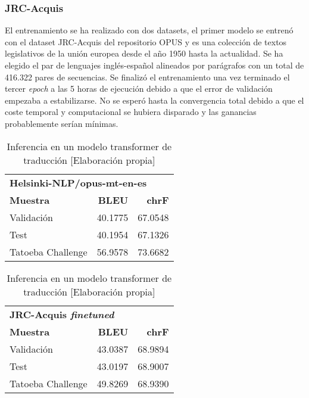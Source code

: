 \subsubsection{JRC-Acquis}
El entrenamiento se ha realizado con dos datasets, el primer modelo se entrenó con el dataset JRC-Acquis del repositorio OPUS \cite{CORPUS} y es una colección de textos legislativos de la unión europea desde el año 1950 hasta la actualidad. Se ha elegido el par de lenguajes inglés-español alineados por parágrafos con un total de 416.322 pares de secuencias.
Se finalizó el entrenamiento una vez terminado el tercer \textit{epoch} a las 5 horas de ejecución debido a que el error de validación empezaba a estabilizarse. No se esperó hasta la convergencia total debido a que el coste temporal y computacional se hubiera disparado y las ganancias probablemente serían mínimas.

\begin{table}[H]
    \begin{center}
        \begin{tabular}{ l r r }
        \multicolumn{3}{l}{\textbf{Helsinki-NLP/opus-mt-en-es}}\\
        \textbf{Muestra} & \textbf{BLEU} & \textbf{chrF} \\
        Validación & 40.1775 & 67.0548 \\
        Test & 40.1954 & 67.1326 \\
        Tatoeba Challenge & 56.9578 & 73.6682
        \end{tabular}
        \caption{Inferencia en un modelo transformer de traducción [Elaboración propia]}\label{originalacquis}
    \end{center}
\end{table}

\begin{table}[H]
    \begin{center}
        \begin{tabular}{ l r r }
        \multicolumn{3}{l}{\textbf{JRC-Acquis \textit{finetuned}}}\\
        \textbf{Muestra} & \textbf{BLEU} & \textbf{chrF} \\
        Validación & 43.0387 & 68.9894 \\
        Test & 43.0197 & 68.9007 \\
        Tatoeba Challenge & 49.8269 & 68.9390
        \end{tabular}
        \caption{Inferencia en un modelo transformer de traducción [Elaboración propia]}\label{finetuneacquis}
    \end{center}
\end{table}


